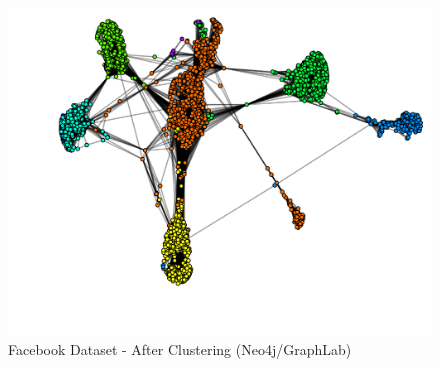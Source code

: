 \begin{figure}
	\centering
	\includegraphics[scale=0.4, trim=0 0 20 0]{Images/after_facebook.pdf}
	\caption{Facebook Dataset - After Clustering (Neo4j/GraphLab)\label{fig:fb-after}}
\end{figure}